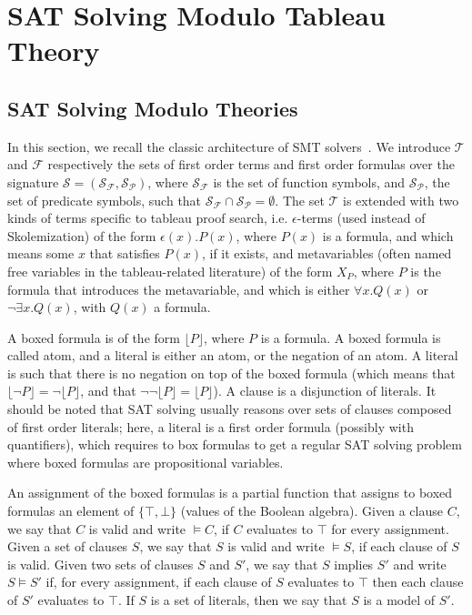 
\section{SAT Solving Modulo Tableau Theory}
\label{sec:smt}


\subsection{SAT Solving Modulo Theories}

In this section, we recall the classic architecture of SMT
solvers~\cite{barrett2006splitting}.  We introduce $\mathcal{T}$ and
$\mathcal{F}$ respectively the sets of first order terms and first order
formulas over the signature
$\mathcal{S}=(\mathcal{S}_\mathcal{F},\mathcal{S}_\mathcal{P})$, where
$\mathcal{S}_\mathcal{F}$ is the set of function symbols, and
$\mathcal{S}_\mathcal{P}$, the set of predicate symbols, such that
$\mathcal{S}_\mathcal{F}\cap\mathcal{S}_\mathcal{P}=\emptyset$. The set
$\mathcal{T}$ is extended with two kinds of terms specific to tableau proof
search, i.e. $\epsilon{}$-terms (used instead of Skolemization) of the form
$\epsilon(x).P(x)$, where $P(x)$ is a formula, and which means some $x$ that
satisfies $P(x)$, if it exists, and metavariables (often named free variables in
the tableau-related literature) of the form $X_P$, where $P$ is the formula that
introduces the metavariable, and which is either $\forall{}x.Q(x)$ or
$\neg\exists{}x.Q(x)$, with $Q(x)$ a formula.

A boxed formula is of the form $\lfloor{}P\rfloor$, where $P$ is a formula. A
boxed formula is called atom, and a literal is either an atom, or the negation
of an atom. A literal is such that there is no negation on top of the boxed
formula (which means that $\lfloor\neg{}P\rfloor=\neg\lfloor{}P\rfloor$, and
that $\neg\neg\lfloor{}P\rfloor=\lfloor{}P\rfloor$). A clause is a disjunction
of literals. It should be noted that SAT solving usually reasons over sets of
clauses composed of first order literals; here, a literal is a first order
formula (possibly with quantifiers), which requires to box formulas to get a
regular SAT solving problem where boxed formulas are propositional variables.

An assignment of the boxed formulas is a partial function that assigns to boxed
formulas an element of $\{\top,\bot\}$ (values of the Boolean algebra). Given a
clause $C$, we say that $C$ is valid and write $\models{}C$, if $C$ evaluates to
$\top$ for every assignment. Given a set of clauses $S$, we say that $S$ is
valid and write $\models{}S$, if each clause of $S$ is valid. Given two sets of
clauses $S$ and $S'$, we say that $S$ implies $S'$ and write $S\models{}S'$ if,
for every assignment, if each clause of $S$ evaluates to $\top$ then each clause
of $S'$ evaluates to $\top$. If $S$ is a set of literals, then we say that $S$
is a model of $S'$.

